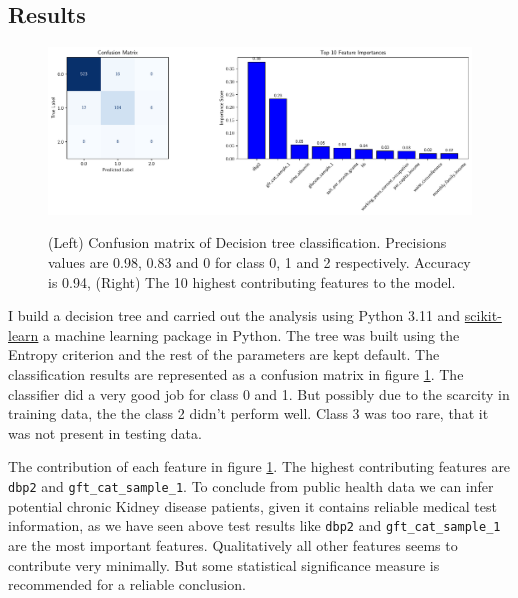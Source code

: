 \documentclass{article}
\begin{document}
\subsection{Results}
\begin{figure}
    \centering
    \includegraphics[scale=.5]{DT_summary.pdf}
    \label{fig:DTsum}
    \caption{(Left) Confusion matrix of Decision tree classification. Precisions values are 
    0.98, 0.83 and 0 for class 0, 1 and 2 respectively. Accuracy is 0.94, (Right) The 10 highest contributing features
    to the model.}
\end{figure}
I build a decision tree and carried out the analysis using Python 3.11 and \href{https://scihttps://scikit-learn.org/}{scikit-learn}
a machine learning package in Python. The tree was built using the Entropy criterion and 
the rest of the parameters are kept default. The classification results are represented as a 
confusion matrix in figure \ref{fig:DTsum}. The classifier did a very good job for class 0 and 1. But possibly due
to the scarcity in training data, the the class 2 didn't perform well. Class 3 was too rare, 
that it was not present in testing data. 

The contribution of each feature in figure \ref{fig:DTsum}. The highest contributing features are \texttt{dbp2} and 
\texttt{gft\_cat\_sample\_1}.
To conclude from public health data we can infer potential chronic Kidney disease patients,
given it contains reliable medical test information, as we have seen above 
test results like \texttt{dbp2} and \texttt{gft\_cat\_sample\_1} are the most important features. 
Qualitatively all other features seems to contribute very minimally. But some statistical significance measure is 
recommended for a reliable conclusion. 
\end{document}
